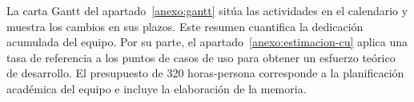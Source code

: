 La carta Gantt del apartado~\ref{anexo:gantt} sitúa las actividades en
el calendario y muestra los cambios en sus plazos. Este resumen
cuantifica la dedicación acumulada del equipo. Por su parte, el
apartado~\ref{anexo:estimacion-cu} aplica una tasa de referencia a los
puntos de casos de uso para obtener un esfuerzo teórico de desarrollo.
El presupuesto de 320 horas-persona corresponde a la planificación
académica del equipo e incluye la elaboración de la memoria.

